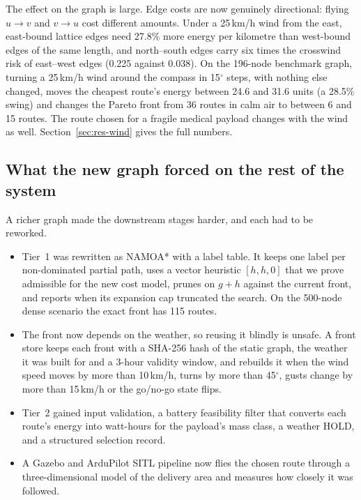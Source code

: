 \documentclass{ssnreview}
\begin{document}
The effect on the graph is large. Edge costs are now genuinely directional: flying
$u \rightarrow v$ and $v \rightarrow u$ cost different amounts. Under a 25\,km/h wind from
the east, east-bound lattice edges need 27.8\% more energy per kilometre than west-bound
edges of the same length, and north--south edges carry six times the crosswind risk of
east--west edges (0.225 against 0.038). On the 196-node benchmark graph, turning a
25\,km/h wind around the compass in 15$^\circ$ steps, with nothing else changed, moves the
cheapest route's energy between 24.6 and 31.6 units (a 28.5\% swing) and changes the
Pareto front from 36 routes in calm air to between 6 and 15 routes. The route chosen for
a fragile medical payload changes with the wind as well. Section~\ref{sec:res-wind} gives
the full numbers.

\subsection{What the new graph forced on the rest of the system}

A richer graph made the downstream stages harder, and each had to be reworked.

\begin{itemize}
  \item Tier~1 was rewritten as NAMOA* \cite{r17} with a label table. It keeps one label
  per non-dominated partial path, uses a vector heuristic $[h, h, 0]$ that we prove
  admissible for the new cost model, prunes on $g + h$ against the current front, and
  reports when its expansion cap truncated the search. On the 500-node dense scenario
  the exact front has 115 routes.
  \item The front now depends on the weather, so reusing it blindly is unsafe. A
  front store keeps each front with a SHA-256 hash of the static graph, the weather it was
  built for and a 3-hour validity window, and rebuilds it when the wind speed moves by more
  than 10\,km/h, turns by more than 45$^\circ$, gusts change by more than 15\,km/h or the
  go/no-go state flips.
  \item Tier~2 gained input validation, a battery feasibility filter that converts each
  route's energy into watt-hours for the payload's mass class, a weather HOLD, and a
  structured selection record.
  \item A Gazebo and ArduPilot SITL pipeline now flies the chosen route through a
  three-dimensional model of the delivery area and measures how closely it was followed.
\end{itemize}
\end{document}
